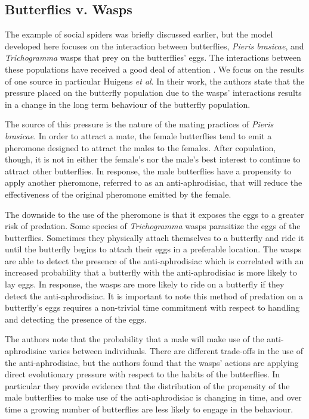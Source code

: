 \documentclass[12pt]{article}
\begin{document}
\subsection{Butterflies v. Wasps}
\label{butterflyVWasps}

The example of social spiders was briefly discussed earlier, but the
model developed here focuses on the interaction between butterflies,
\textit{Pieris brasicae}, and \textit{Trichogramma} wasps that prey on
the butterflies' eggs. The interactions between these populations have
received a good deal of attention
\cite{PMC2797620,doi:10.1111/j.1439-0418.1986.tb00834.x,Figueroa2010AttractionOT,10.3389/fpls.2019.01768}. We
focus on the results of one source in particular Huigens \textit{et
  al}\cite{10.1093/beheco/arq007}. In their work, the authors state
that the pressure placed on the butterfly population due to the wasps'
interactions results in a change in the long term behaviour of the
butterfly population.

The source of this pressure is the nature of the mating practices of
\textit{Pieris brasicae}. In order to attract a mate, the female
butterflies tend to emit a pheromone designed to attract the males to
the females. After copulation, though, it is not in either the
female's nor the male's best interest to continue to attract other
butterflies. In response, the male butterflies have a propensity to
apply another pheromone, referred to as an anti-aphrodisiac, that will
reduce the effectiveness of the original pheromone emitted by the
female.

The downside to the use of the pheromone is that it exposes the eggs
to a greater risk of predation. Some species of \textit{Trichogramma}
wasps parasitize the eggs of the butterflies. Sometimes they
physically attach themselves to a butterfly and ride it until the
butterfly begins to attach their eggs in a preferable location. The
wasps are able to detect the presence of the anti-aphrodisiac which is
correlated with an increased probability that a butterfly with the
anti-aphrodisiac is more likely to lay eggs. In response, the wasps
are more likely to ride on a butterfly if they detect the
anti-aphrodisiac. It is important to note this method of predation on
a butterfly's eggs requires a non-trivial time commitment with respect
to handling and detecting the presence of the eggs.

The authors\cite{10.1093/beheco/arq007} note that the probability that
a male will make use of the anti-aphrodisiac varies between
individuals. There are different trade-offs in the use of the
anti-aphrodisiac, but the authors found that the wasps' actions are
applying direct evolutionary pressure with respect to the habits of
the butterflies. In particular they provide evidence that the
distribution of the propensity of the male butterflies to make use of
the anti-aphrodisiac is changing in time, and over time a growing
number of butterflies are less likely to engage in the behaviour.
\end{document}
